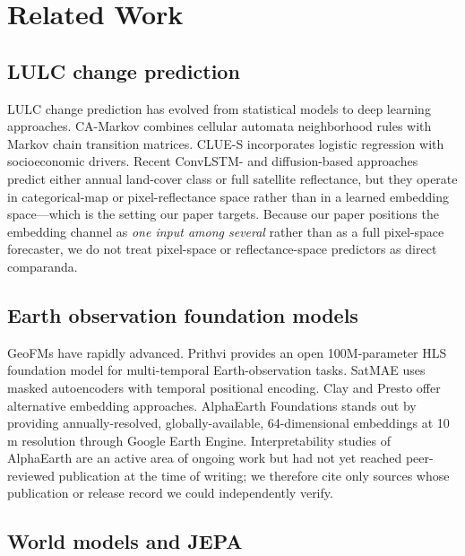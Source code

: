 \documentclass{article}
\begin{document}
\section{Related Work}
\label{sec:related}

\subsection{LULC change prediction}

LULC change prediction has evolved from statistical models to deep learning approaches. CA-Markov \citep{veldkamp2004clues} combines cellular automata neighborhood rules with Markov chain transition matrices. CLUE-S \citep{verburg2002clues} incorporates logistic regression with socioeconomic drivers. Recent ConvLSTM- and diffusion-based approaches predict either annual land-cover class or full satellite reflectance, but they operate in categorical-map or pixel-reflectance space rather than in a learned embedding space---which is the setting our paper targets. Because our paper positions the embedding channel as \textit{one input among several} rather than as a full pixel-space forecaster, we do not treat pixel-space or reflectance-space predictors as direct comparanda.

\subsection{Earth observation foundation models}

GeoFMs have rapidly advanced. Prithvi \citep{jakubik2024prithvi} provides an open 100M-parameter HLS foundation model for multi-temporal Earth-observation tasks. SatMAE \citep{cong2022satmae} uses masked autoencoders with temporal positional encoding. Clay and Presto offer alternative embedding approaches. AlphaEarth Foundations \citep{brown2025alphaearth} stands out by providing annually-resolved, globally-available, 64-dimensional embeddings at 10\,m resolution through Google Earth Engine. Interpretability studies of AlphaEarth are an active area of ongoing work but had not yet reached peer-reviewed publication at the time of writing; we therefore cite only sources whose publication or release record we could independently verify.

\subsection{World models and JEPA}
\end{document}
